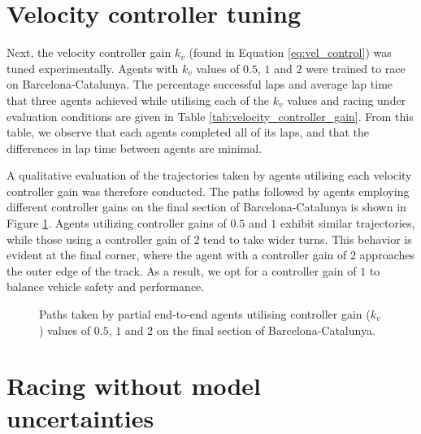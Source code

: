 \section{Velocity controller tuning}

Next, the velocity controller gain $k_v$ (found in Equation \ref{eq:vel_control}) was tuned experimentally.
Agents with $k_v$ values of $0.5$, $1$ and $2$ were trained to race on Barcelona-Catalunya.
The percentage successful laps and average lap time that three agents achieved while utilising each of the $k_v$ values and racing under evaluation conditions are given in Table \ref{tab:velocity_controller_gain}.
From this table, we observe that each agents completed all of its laps, and that the differences in lap time between agents are minimal.



A qualitative evaluation of the trajectories taken by agents utilising each velocity controller gain was therefore conducted.
The paths followed by agents employing different controller gains on the final section of Barcelona-Catalunya is shown in Figure \ref{fig:kv_paths}.
Agents utilizing controller gains of $0.5$ and $1$ exhibit similar trajectories, while those using a controller gain of $2$ tend to take wider turns. 
This behavior is evident at the final corner, where the agent with a controller gain of $2$ approaches the outer edge of the track. 
As a result, we opt for a controller gain of $1$ to balance vehicle safety and performance.

\begin{figure}[htb!]
    \centering
    
    \caption[Paths taken by partial end-to-end agents utilising controller gain ($k_v$) values of $0.5$, $1$ and $2$ on the final section of  Barcelona-Catalunya]{Paths taken by partial end-to-end agents utilising controller gain ($k_v$) values of $0.5$, $1$ and $2$ on the final section of  Barcelona-Catalunya.}
    \label{fig:kv_paths}
\end{figure}










\section{Racing without model uncertainties}

